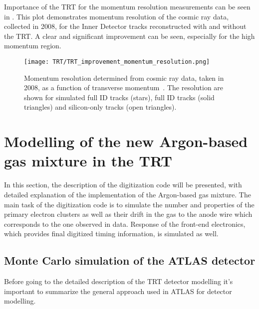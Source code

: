 Importance of the TRT for the momentum resolution measurements can be seen in .
This plot demonstrates momentum resolution of the cosmic ray data, collected in 2008, for the Inner Detector tracks reconstructed with and without the TRT.
A clear and significant improvement can be seen, especially for the high momentum region.


\begin{figure}
\centering
\texttt{[image: TRT/TRT\_improvement\_momentum\_resolution.png]}
\caption{ 
Momentum resolution determined from cosmic ray data, taken in 2008, as a function of transverse momentum~\cite{Aad:2010bx}.
The resolution are shown for simulated full ID tracks (stars), full ID tracks (solid triangles) and silicon-only tracks (open triangles).
}
\label{fig:improvement_of_momentum_resolution}
\end{figure}



\section{Modelling of the new Argon-based gas mixture in the TRT}
\label{sec:digi_argon}

In this section, the description of the digitization code will be presented, with detailed explanation of the implementation of the Argon-based gas mixture.
The main task of the digitization code is to simulate the number and properties of the primary electron clusters as well as their drift in the gas to the anode wire which corresponds to the one observed in data. 
Response of the front-end electronics, which provides final digitized timing information, is simulated as well. 

\subsection{Monte Carlo simulation of the ATLAS detector}

Before going to the detailed description of the TRT detector modelling it's important to summarize the
general approach used in ATLAS for detector modelling.

